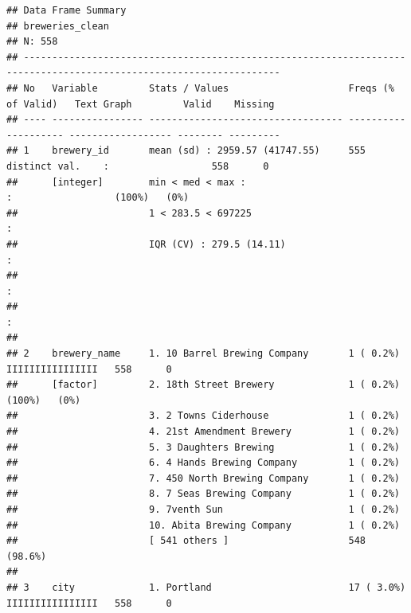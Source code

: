 \documentclass[]{article}
\begin{document}
\begin{verbatim}
## Data Frame Summary   
## breweries_clean   
## N: 558   
## -------------------------------------------------------------------------------------------------------------------
## No   Variable         Stats / Values                     Freqs (% of Valid)   Text Graph         Valid    Missing  
## ---- ---------------- ---------------------------------- -------------------- ------------------ -------- ---------
## 1    brewery_id       mean (sd) : 2959.57 (41747.55)     555 distinct val.    :                  558      0        
##      [integer]        min < med < max :                                       :                  (100%)   (0%)     
##                       1 < 283.5 < 697225                                      :                                    
##                       IQR (CV) : 279.5 (14.11)                                :                                    
##                                                                               :                                    
##                                                                               :                                    
## 
## 2    brewery_name     1. 10 Barrel Brewing Company       1 ( 0.2%)            IIIIIIIIIIIIIIII   558      0        
##      [factor]         2. 18th Street Brewery             1 ( 0.2%)                               (100%)   (0%)     
##                       3. 2 Towns Ciderhouse              1 ( 0.2%)                                                 
##                       4. 21st Amendment Brewery          1 ( 0.2%)                                                 
##                       5. 3 Daughters Brewing             1 ( 0.2%)                                                 
##                       6. 4 Hands Brewing Company         1 ( 0.2%)                                                 
##                       7. 450 North Brewing Company       1 ( 0.2%)                                                 
##                       8. 7 Seas Brewing Company          1 ( 0.2%)                                                 
##                       9. 7venth Sun                      1 ( 0.2%)                                                 
##                       10. Abita Brewing Company          1 ( 0.2%)                                                 
##                       [ 541 others ]                     548 (98.6%)                                               
## 
## 3    city             1. Portland                        17 ( 3.0%)           IIIIIIIIIIIIIIII   558      0        

\end{verbatim}
\end{document}
